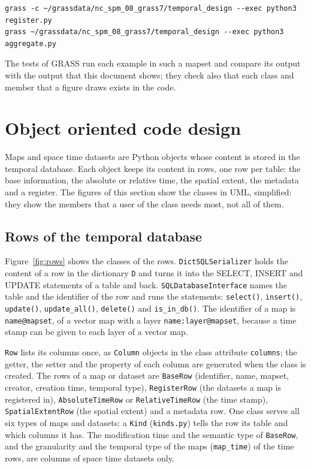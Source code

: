 \documentclass[10pt,a4paper]{article}
\newcommand{\code}[1]{\texttt{#1}}
\begin{document}
\begin{lstlisting}[style=output]
grass -c ~/grassdata/nc_spm_08_grass7/temporal_design --exec python3 register.py
grass ~/grassdata/nc_spm_08_grass7/temporal_design --exec python3 aggregate.py
\end{lstlisting}

\noindent The tests of GRASS run each example in such a mapset and compare its
output with the output that this document shows; they check also that each
class and member that a figure draws exists in the code.

\section{Object oriented code design}
\label{sec:design}

Maps and space time datasets are Python objects whose content is stored in
the temporal database. Each object keeps its content in rows, one row per
table: the base information, the absolute or relative time, the spatial
extent, the metadata and a register. The figures of this section show the
classes in UML, simplified: they show the members that a user of the class
needs most, not all of them.

\subsection{Rows of the temporal database}

Figure~\ref{fig:rows} shows the classes of the rows. \code{DictSQLSerializer}
holds the content of a row in the dictionary \code{D} and turns it into the
SELECT, INSERT and UPDATE statements of a table and back.
\code{SQLDatabaseInterface} names the table and the identifier of the row and
runs the statements: \code{select()}, \code{insert()}, \code{update()},
\code{update\_all()}, \code{delete()} and \code{is\_in\_db()}. The identifier of a
map is \code{name@mapset}, of a vector map with a layer \code{name:layer@mapset},
because a time stamp can be given to each layer of a vector map.

\code{Row} lists its columns once, as \code{Column} objects in the class
attribute \code{columns}; the getter, the setter and the property of each
column are generated when the class is created. The rows of a map or dataset
are \code{BaseRow} (identifier, name, mapset, creator, creation time, temporal
type), \code{RegisterRow} (the datasets a map is registered in),
\code{AbsoluteTimeRow} or \code{RelativeTimeRow} (the time stamp),
\code{SpatialExtentRow} (the spatial extent) and a metadata row. One class
serves all six types of maps and datasets: a \code{Kind} (\code{kinds.py})
tells the row its table and which columns it has. The modification time and
the semantic type of \code{BaseRow}, and the granularity and the temporal type
of the maps (\code{map\_time}) of the time rows, are columns of space time
datasets only.
\end{document}
